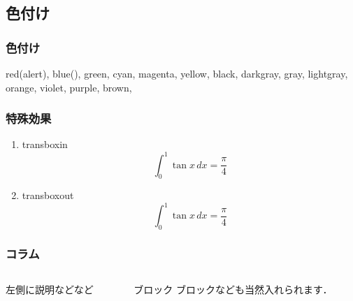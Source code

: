 \documentclass[dvipdfm]{beamer}
\begin{document}
\subsection{色付け}
\begin{frame}[t, fragile]
 \frametitle{色付け}
  {\color{red} red}(\alert{alert}),
  {\color{blue} blue}(),
  {\color{green} green},
  {\color{cyan} cyan},
  {\color{magenta} magenta},
  {\color{yellow} yellow},
  {\color{black} black},
  {\color{darkgray} darkgray},
  {\color{gray} gray},
  {\color{lightgray} lightgray},
  {\color{orange} orange},
  {\color{violet} violet},
  {\color{purple} purple},
  {\color{brown} brown},

\end{frame}





\begin{frame}[t]
 \frametitle{特殊効果}
   \begin{enumerate}
  \item<1> 
   {\huge transboxin
   \[\int_{0}^{1}\tan x\, dx=\dfrac{\pi}{4}\]
   }
  \item<2>
   {\huge transboxout
   \[\int_{0}^{1}\tan x\, dx=\dfrac{\pi}{4}\]
   }
   \end{enumerate}
\end{frame}




\begin{frame}[t]
 \frametitle{コラム}
  \begin{columns}[t]
   \begin{column}{.3\textwidth}
    左側に説明などなど
   \end{column}
   \begin{column}{.4\textwidth}
    \begin{alertblock}{ブロック}
     ブロックなども当然入れられます．
    \end{alertblock}
   \end{column}
  \end{columns}
\end{frame}
\end{document}
